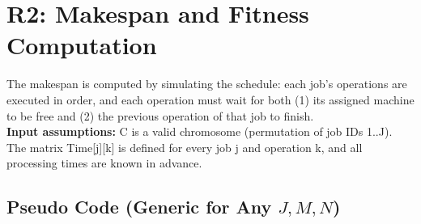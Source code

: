 \documentclass[10pt,twocolumn]{article}
\begin{document}
\section{R2: Makespan and Fitness Computation}

The makespan is computed by simulating the schedule: each job's operations are executed in order, and each operation must wait for both (1) its assigned machine to be free and (2) the previous operation of that job to finish.
\\\textbf{Input assumptions:}
C is a valid chromosome (permutation of job IDs 1..J). The matrix Time[j][k] is defined for every job j and operation k, and all processing times are known in advance.
\subsection*{Pseudo Code (Generic for Any $J, M, N$)}
\end{document}
